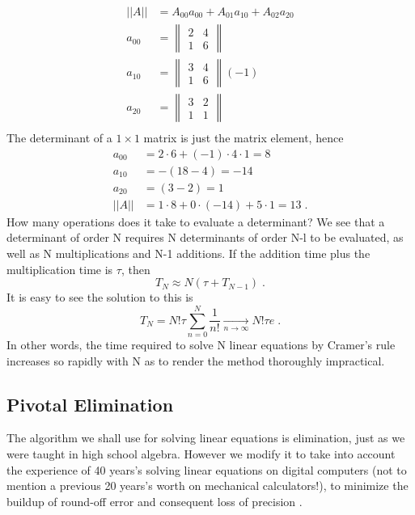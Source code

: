 \begin{align*}
	||A||&=A_{00}a_{00}+A_{01}a_{10}+	A_{02}a_{20}\\
	a_{00} &= 
	\begin{Vmatrix}
		2 & 4\\
		1 & 6
	\end{Vmatrix}\\
	a_{10} &= 
	\begin{Vmatrix}
		3 & 4\\
		1 & 6
	\end{Vmatrix} (-1)\\
	a_{20} &= 
	\begin{Vmatrix}
		3 & 2\\
		1 & 1
	\end{Vmatrix}\\
\end{align*}
The determinant of a $1 \times 1$ matrix is just the matrix element, hence
\begin{align*}
	a_{00} &=  2 \cdot 6 + (-1)\cdot 4\cdot 1 = 8\\
	a_{10} &=  -(18 - 4) = -14\\
	a_{20} &=  (3 -2) = 1\\
	||A||&= 1\cdot 8 + 0\cdot (-14)+ 5\cdot 1 =13\;.
\end{align*}
How many operations does it take to evaluate a determinant? We
see that a determinant of order N requires N determinants of
order N-l to be evaluated, as well as N multiplications and N-1
additions. If the addition time plus the multiplication time is $\tau$,
then
\begin{equation*}
	T_N\approx N(\tau +T_{N-1})\;.
\end{equation*}
It is easy to see the solution to this is
\begin{equation*}
	T_N =N!\tau \sum_{n=0}^{N}\frac{1}{n!} \underset{n\to\infty}{\rightarrow} N!\tau e\;.
\end{equation*}
In other words, the time required to solve N linear equations by
Cramer's rule increases so rapidly with N as to render the method
thoroughly impractical.

\subsection{Pivotal Elimination}
The algorithm we shall use for solving linear equations is elimination, just as we were taught in high school algebra. However we
modify it to take into account the experience of 40 years's solving
linear equations on digital computers (not to mention a previous
20 years's worth on mechanical calculators!), to minimize the
buildup of round-off error and consequent loss of precision .

